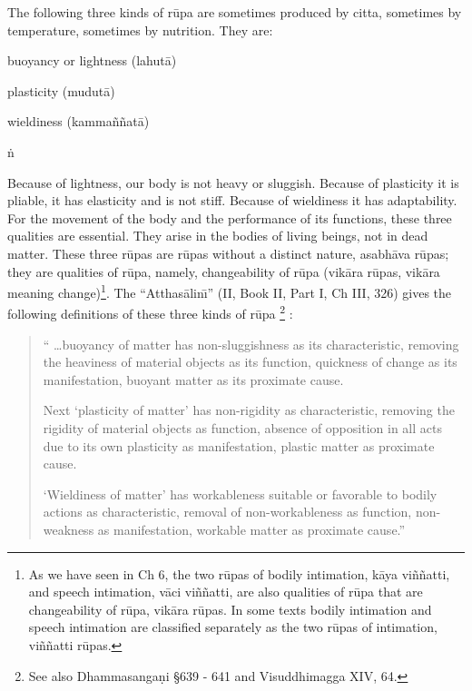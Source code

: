 \documentclass{book}
\begin{document}
The following three kinds of r\=upa are sometimes produced by citta,
sometimes by temperature, sometimes by nutrition. They are:




\begin{description}
\item buoyancy or lightness (lahut{\=a})

\item plasticity (mudut{\=a})

\item wieldiness (kamma\~n\~nat{\=a})
\end{description}


\.n

Because of lightness, our body is not heavy or sluggish. Because of
plasticity it is pliable, it has elasticity and is not stiff. Because
of wieldiness it has adaptability. For the movement of the body and the
performance of its functions, these three qualities are essential. They
arise in the bodies of living beings, not in dead matter. These three
r\=upas are r\=upas without a distinct nature, asabh{\=a}va r\=upas;
they are qualities of r\=upa, namely, changeability of r\=upa
(vik{\=a}ra r\=upas, vik{\=a}ra meaning change)\footnote{As we have
seen in Ch 6, the two r\=upas of bodily intimation, k{\=a}ya
vi\~n\~natti, and speech intimation, v{\=a}ci vi\~n\~natti, are also
qualities of r\=upa that are changeability of r\=upa, vik{\=a}ra
r\=upas. In some texts bodily intimation and speech intimation are
classified separately as the two r\=upas of intimation, vi\~n\~natti
r\=upas.}. The ``Atthas{\=a}lin\=\i'' (II, Book II, Part I, Ch III,
326) gives the following definitions of these three kinds of r\=upa
\footnote{See also Dhamma\-sanga\d ni {\S}639 - 641 and Visuddhimagga
XIV, 64.} : 




\begin{quote}\begin{flushleft}
`` \ldots buoyancy of matter has non-sluggishness as its characteristic,
removing the heaviness of material objects as its function, quickness
of change as its manifestation, buoyant matter as its proximate cause.

Next `plasticity of matter' has non-rigidity as characteristic,
removing the rigidity of material objects as function, absence of
opposition in all acts due to its own plasticity as manifestation,
plastic matter as proximate cause.

`Wieldiness of matter' has workableness suitable or favorable to bodily
actions as characteristic, removal of non-workableness as function,
non- weakness as manifestation, workable matter as proximate cause.''

\end{flushleft}\end{quote}
\end{document}
